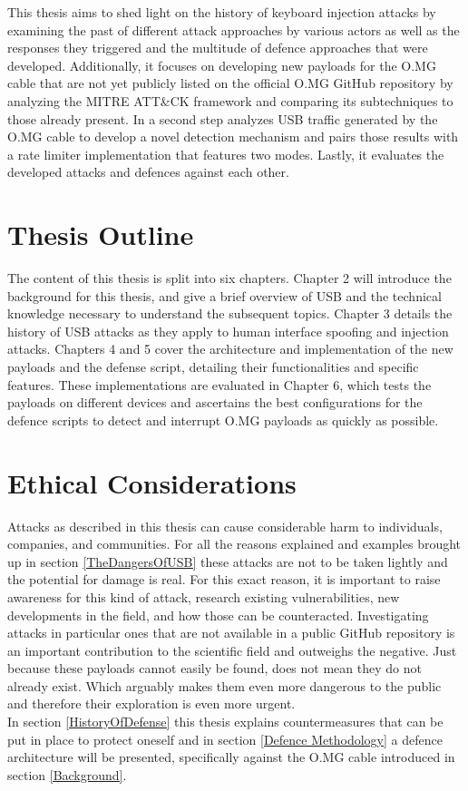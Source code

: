 This thesis aims to shed light on the history of keyboard injection attacks by examining the past of different attack approaches by various actors as well as the responses they triggered and the multitude of defence approaches that were developed. Additionally, it focuses on developing new payloads for the O.MG cable that are not yet publicly listed on the official O.MG GitHub repository by analyzing the MITRE ATT\&CK framework and comparing its subtechniques to those already present. In a second step analyzes USB traffic generated by the O.MG cable to develop a novel detection mechanism and pairs those results with a rate limiter implementation that features two modes. Lastly, it evaluates the developed attacks and defences against each other.

\section{Thesis Outline}
The content of this thesis is split into six chapters. Chapter 2 will introduce the background for this thesis, and give a brief overview of USB and the technical knowledge necessary to understand the subsequent topics. Chapter 3 details the history of USB attacks as they apply to human interface spoofing and injection attacks. Chapters 4 and 5 cover the architecture and implementation of the new payloads and the defense script, detailing their functionalities and specific features. These implementations are evaluated in Chapter 6, which tests the payloads on different devices and ascertains the best configurations for the defence scripts to detect and interrupt O.MG payloads as quickly as possible.

\section{Ethical Considerations}
Attacks as described in this thesis can cause considerable harm to individuals, companies, and communities. For all the reasons explained and examples brought up in section \ref{TheDangersOfUSB} these attacks are not to be taken lightly and the potential for damage is real. For this exact reason, it is important to raise awareness for this kind of attack, research existing vulnerabilities, new developments in the field, and how those can be counteracted. Investigating attacks in particular ones that are not available in a public GitHub repository is an important contribution to the scientific field and outweighs the negative. Just because these payloads cannot easily be found, does not mean they do not already exist. Which arguably makes them even more dangerous to the public and therefore their exploration is even more urgent. \\
In section \ref{HistoryOfDefense} this thesis explains countermeasures that can be put in place to protect oneself and in section \ref{Defence Methodology} a defence architecture will be presented, specifically against the O.MG cable introduced in section \ref{Background}.

